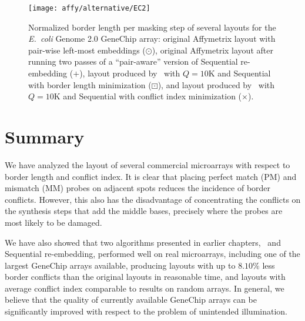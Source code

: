 \begin{figure}[t]\centering
\texttt{[image: affy/alternative/EC2]}
\caption{\label{fig:alternative_ec2}%
  Normalized border length per masking step of several layouts for the \emph{E.\ coli}
  Genome 2.0 GeneChip array: original Affymetrix layout with pair-wise left-most
  embeddings ({\tiny $\odot$}), original Affymetrix layout after running two
  passes of a ``pair-aware'' version of Sequential re-embedding ({\tiny $+$}),
  layout produced by \Greedyplus\ with $Q=10$K and Sequential with border length
  minimization ({\tiny $\boxdot$}), and layout produced by \Greedyplus\ with
  $Q=10$K and Sequential with conflict index minimization
  ({\scriptsize $\times$}).}
\end{figure}

\section{Summary}
\label{sec:affy_summary}

We have analyzed the layout of several commercial microarrays with respect to
border length and conflict index. It is clear that placing perfect match (PM)
and mismatch (MM) probes on adjacent spots reduces the incidence of border
conflicts. However, this also has the disadvantage of concentrating the
conflicts on the synthesis steps that add the middle bases, precisely where the
probes are most likely to be damaged.

We have also showed that two algorithms presented in earlier chapters,
\Greedyplus\ and Sequential re-embedding, performed well on real microarrays,
including one of the largest GeneChip arrays available, producing layouts with
up to $8.10\%$ less border conflicts than the original layouts in reasonable
time, and layouts with average conflict index comparable to results on random
arrays. In general, we believe that the quality of currently available GeneChip
arrays can be significantly improved with respect to the problem of unintended
illumination.
